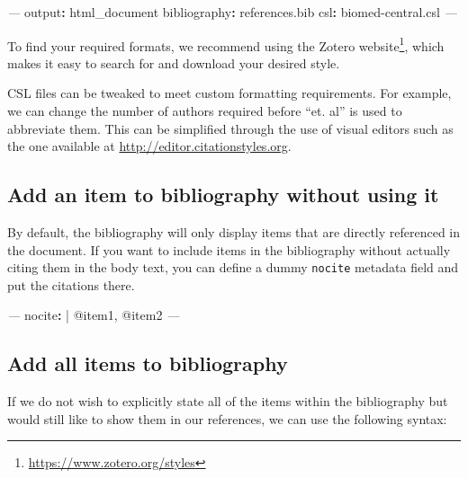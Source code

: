 \documentclass[
  11pt,
]{krantz}
\newenvironment{Shaded}{\begin{snugshade}}{\end{snugshade}}
\newcommand{\AttributeTok}[1]{\textcolor[rgb]{0.61,0.61,0.61}{#1}}
\newcommand{\CharTok}[1]{\textcolor[rgb]{0.5,0.5,0.5}{#1}}
\newcommand{\FunctionTok}[1]{\textcolor[rgb]{0,0,0}{#1}}
\newcommand{\KeywordTok}[1]{\textcolor[rgb]{0.27,0.27,0.27}{\textbf{#1}}}
\newcommand{\NormalTok}[1]{#1}
\newcommand{\PreprocessorTok}[1]{\textcolor[rgb]{0.37,0.37,0.37}{\textit{#1}}}
\renewcommand{\href}[2]{#2\footnote{\url{#1}}}
\begin{document}
\begin{Shaded}
\begin{Highlighting}[]
\PreprocessorTok{---}
\FunctionTok{output}\KeywordTok{:}\AttributeTok{ html_document}
\FunctionTok{bibliography}\KeywordTok{:}\AttributeTok{ references.bib}
\FunctionTok{csl}\KeywordTok{:}\AttributeTok{ biomed-central.csl}
\PreprocessorTok{---}
\end{Highlighting}
\end{Shaded}

To find your required formats, we recommend using \href{https://www.zotero.org/styles}{the Zotero website}, which makes it easy to search for and download your desired style.

CSL files can be tweaked to meet custom formatting requirements. For example, we can change the number of authors required before ``et. al'' is used to abbreviate them. This can be simplified through the use of visual editors such as the one available at \url{http://editor.citationstyles.org}.

\hypertarget{add-an-item-to-bibliography-without-using-it}{%
\subsection{Add an item to bibliography without using it}\label{add-an-item-to-bibliography-without-using-it}}

By default, the bibliography will only display items that are directly referenced in the document. If you want to include items in the bibliography without actually citing them in the body text, you can define a dummy \texttt{nocite} metadata field and put the citations there.

\begin{Shaded}
\begin{Highlighting}[]
\PreprocessorTok{---}
\FunctionTok{nocite}\KeywordTok{: }\CharTok{|}
\NormalTok{  @item1, @item2}
\PreprocessorTok{---}
\end{Highlighting}
\end{Shaded}

\hypertarget{add-all-items-to-bibliography}{%
\subsection{Add all items to bibliography}\label{add-all-items-to-bibliography}}

If we do not wish to explicitly state all of the items within the bibliography but would still like to show them in our references, we can use the following syntax:
\end{document}
